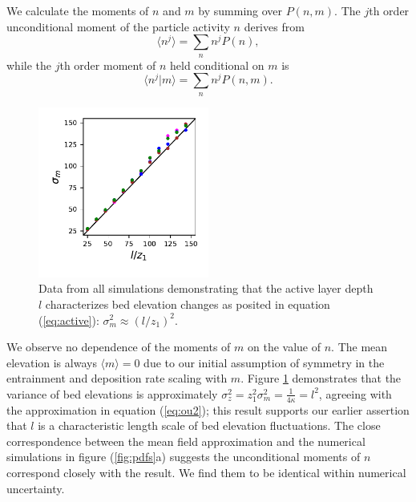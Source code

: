 \documentclass[draft]{agujournal2018}
\begin{document}
We calculate the moments of $n$ and $m$ by summing over $P(n,m)$. 
The $j$th order unconditional moment of the particle activity $n$ derives from
\begin{equation} \langle n^j \rangle = \sum_{n}n^jP(n),\end{equation}
while the $j$th order moment of $n$ held conditional on $m$ is
\begin{equation} \langle n^j|m \rangle = \sum_{n}n^j P(n,m) .\end{equation}
\begin{figure}
	\centering
	\includegraphics[width=0.5\textwidth,keepaspectratio]{variance.pdf}
	\caption{Data from all simulations demonstrating that the active layer depth $l$ characterizes bed elevation changes as posited in equation (\ref{eq:active}): $\sigma_m^2 \approx (l/z_1)^2$. }
	\label{fig:var}
\end{figure}
We observe no dependence of the moments of $m$ on the value of $n$. 
The mean elevation is always $\langle m \rangle = 0 $ due to our initial assumption of symmetry in the entrainment and deposition rate scaling with $m$. 
Figure \ref{fig:var} demonstrates that the variance of bed elevations is approximately $\sigma_z^2 = z_1^2 \sigma_m^2 = \frac{1}{4\kappa}=l^2$, agreeing with the approximation in equation (\ref{eq:ou2}); this result supports our earlier assertion that $l$ is a characteristic length scale of bed elevation fluctuations.
The close correspondence between the mean field approximation and the numerical simulations in figure (\ref{fig:pdfs}a) suggests the unconditional moments of $n$ correspond closely with the \citet{Ancey2008} result. We find them to be identical within numerical uncertainty.
\end{document}
